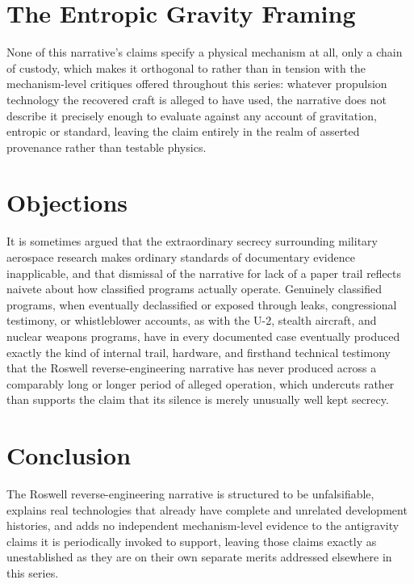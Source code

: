 \documentclass[11pt]{article}
\begin{document}
\section{The Entropic Gravity Framing}

None of this narrative's claims specify a physical mechanism at all, only a chain of custody, which makes it orthogonal to rather than in tension with the mechanism-level critiques offered throughout this series: whatever propulsion technology the recovered craft is alleged to have used, the narrative does not describe it precisely enough to evaluate against any account of gravitation, entropic or standard, leaving the claim entirely in the realm of asserted provenance rather than testable physics.

\section{Objections}

It is sometimes argued that the extraordinary secrecy surrounding military aerospace research makes ordinary standards of documentary evidence inapplicable, and that dismissal of the narrative for lack of a paper trail reflects naivete about how classified programs actually operate. Genuinely classified programs, when eventually declassified or exposed through leaks, congressional testimony, or whistleblower accounts, as with the U-2, stealth aircraft, and nuclear weapons programs, have in every documented case eventually produced exactly the kind of internal trail, hardware, and firsthand technical testimony that the Roswell reverse-engineering narrative has never produced across a comparably long or longer period of alleged operation, which undercuts rather than supports the claim that its silence is merely unusually well kept secrecy.

\section{Conclusion}

The Roswell reverse-engineering narrative is structured to be unfalsifiable, explains real technologies that already have complete and unrelated development histories, and adds no independent mechanism-level evidence to the antigravity claims it is periodically invoked to support, leaving those claims exactly as unestablished as they are on their own separate merits addressed elsewhere in this series.
\end{document}
